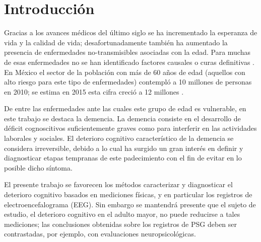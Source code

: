 
\chapter{Introducción}

Gracias a los avances médicos del último siglo se ha incrementado la esperanza de vida y la 
calidad de vida; desafortunadamente también ha aumentado la presencia de enfermedades 
no-transmisibles asociadas con la edad. 
%
Para muchas de esas enfermedades no se han identificado factores causales o curas definitivas 
\cite{PlanAlzheimer04}.
%
En México el sector de la población con más de 60 años de edad (aquellos con alto riesgo para este
tipo de enfermedades) contempló a 10 millones de personas en 2010; se estima en 2015 esta cifra 
creció a 12 millones \cite{Censo10,Intercensal15}.

De entre las enfermedades ante las cuales este grupo de edad es vulnerable, en este trabajo se 
destaca la demencia. 
%
La demencia consiste en el desarrollo de déficit cognoscitivos suficientemente graves como para 
interferir en las actividades laborales y sociales.
%
El deterioro cognitivo característico de la demencia se considera irreversible, debido a lo cual 
ha surgido un gran interés en definir y diagnosticar etapas tempranas de este padecimiento con el 
fin de evitar en lo posible dicho síntoma.


El presente trabajo se favorecen los métodos caracterizar y diagnosticar el deterioro cognitivo
basados en mediciones físicas, y en particular los registros de electroencefalograma (EEG).
%
%
Sin embargo se mantendrá presente que el sujeto de estudio, el deterioro cognitivo en el adulto 
mayor, no puede reducirse a tales mediciones; las conclusiones obtenidas sobre los registros de PSG 
deben ser contrastadas, por ejemplo, con evaluaciones neuropsicológicas.



